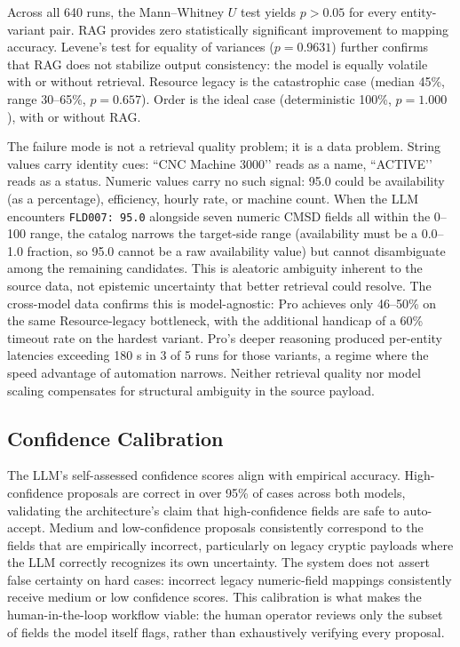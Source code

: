 \documentclass[3p,times,procedia]{elsarticle}
\begin{document}
Across all 640 runs, the Mann--Whitney $U$ test yields $p > 0.05$ for every entity-variant pair. RAG provides zero statistically significant improvement to mapping accuracy. Levene’s test for equality of variances ($p = 0.9631$) further confirms that RAG does not stabilize output consistency: the model is equally volatile with or without retrieval. Resource legacy is the catastrophic case (median 45\%, range 30--65\%, $p = 0.657$). Order is the ideal case (deterministic 100\%, $p = 1.000$), with or without RAG.

The failure mode is not a retrieval quality problem; it is a data problem. String values carry identity cues: ``CNC Machine 3000’’ reads as a name, ``ACTIVE’’ reads as a status. Numeric values carry no such signal: 95.0 could be availability (as a percentage), efficiency, hourly rate, or machine count. When the LLM encounters \texttt{FLD007: 95.0} alongside seven numeric CMSD fields all within the 0--100 range, the catalog narrows the target-side range (availability must be a 0.0--1.0 fraction, so 95.0 cannot be a raw availability value) but cannot disambiguate among the remaining candidates. This is aleatoric ambiguity inherent to the source data, not epistemic uncertainty that better retrieval could resolve. The cross-model data confirms this is model-agnostic: Pro achieves only 46--50\% on the same Resource-legacy bottleneck, with the additional handicap of a 60\% timeout rate on the hardest variant. Pro's deeper reasoning produced per-entity latencies exceeding 180 s in 3 of 5 runs for those variants, a regime where the speed advantage of automation narrows. Neither retrieval quality nor model scaling compensates for structural ambiguity in the source payload.

\subsection{Confidence Calibration}
\label{sec:eval-confidence}

The LLM's self-assessed confidence scores align with empirical accuracy. High-confidence proposals are correct in over 95\% of cases across both models, validating the architecture's claim that high-confidence fields are safe to auto-accept. Medium and low-confidence proposals consistently correspond to the fields that are empirically incorrect, particularly on legacy cryptic payloads where the LLM correctly recognizes its own uncertainty. The system does not assert false certainty on hard cases: incorrect legacy numeric-field mappings consistently receive medium or low confidence scores. This calibration is what makes the human-in-the-loop workflow viable: the human operator reviews only the subset of fields the model itself flags, rather than exhaustively verifying every proposal.
\end{document}
